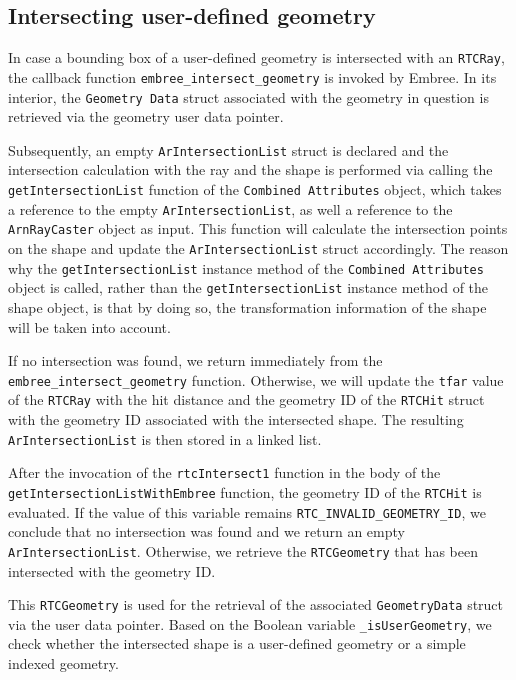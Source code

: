 \subsection{Intersecting user-defined geometry}
\label{subsec:instersect}

In case a bounding box of a user-defined geometry is intersected with an \texttt{RTCRay}, the callback function \texttt{embree\_intersect\_geometry} is invoked by Embree. In its interior, the \texttt{Geometry Data} struct associated with the geometry in question is retrieved via the geometry user data pointer. 

Subsequently, an empty \texttt{ArIntersectionList} struct is declared and the intersection calculation with the ray and the shape is performed via calling the \texttt{getIntersectionList} function of the \texttt{Combined Attributes} object, which takes a reference to the empty \texttt{ArIntersectionList}, as well a reference to the \texttt{ArnRayCaster} object as input.
This function will calculate the intersection points on the shape and update the \texttt{ArIntersectionList} struct accordingly. The reason why the \texttt{getIntersectionList} instance method of the \texttt{Combined Attributes} object is called, rather than the \texttt{getIntersectionList} instance method of the shape object, is that by doing so, the transformation information of the shape will be taken into account.

If no intersection was found, we return immediately from the \texttt{embree\_intersect\_geometry} function. Otherwise, we will update the \texttt{tfar} value of the \texttt{RTCRay} with the hit distance and the geometry ID of the \texttt{RTCHit} struct with the geometry ID associated with the intersected shape.
The resulting \texttt{ArIntersectionList} is then stored in a linked list.

After the invocation of the \texttt{rtcIntersect1} function in the body of the  \texttt{getIntersectionListWithEmbree} function, the geometry ID of the \texttt{RTCHit} is evaluated. If the value of this variable remains \texttt{RTC\_INVALID\_GEOMETRY\_ID}, we conclude that no intersection was found and we return an empty \texttt{ArIntersectionList}. Otherwise, we retrieve the \texttt{RTCGeometry} that has been intersected with the geometry ID.

This \texttt{RTCGeometry} is used for the retrieval of the associated \texttt{GeometryData} struct via the user data pointer. Based on the Boolean variable \texttt{\_isUserGeometry}, we check whether the intersected shape is a user-defined geometry or a simple indexed geometry.

